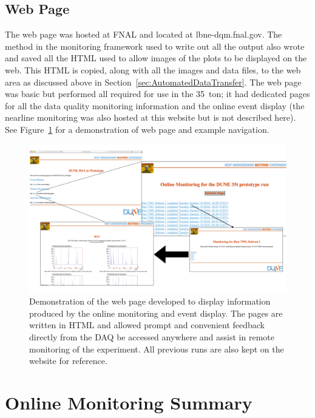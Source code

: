 \subsection{Web Page}\label{sec:WebPage}

The web page was hosted at FNAL and located at lbne-dqm.fnal.gov.  The method in the monitoring framework used to write out all the output also wrote and saved all the HTML used to allow images of the plots to be displayed on the web.  This HTML is copied, along with all the images and data files, to the web area as discussed above in Section~\ref{sec:AutomatedDataTransfer}.  The web page was basic but performed all required for use in the 35~ton; it had dedicated pages for all the data quality monitoring information and the online event display (the nearline monitoring was also hosted at this website but is not described here).  See Figure~\ref{fig:WebPage} for a demonstration of web page and example navigation.

\begin{figure}
  \centering
  \includegraphics[width=14cm]{webPage.png}
  \caption[Web page for online monitoring and event displays]{Demonstration of the web page developed to display information produced by the online monitoring and event display.  The pages are written in HTML and allowed prompt and convenient feedback directly from the DAQ be accessed anywhere and assist in remote monitoring of the experiment.  All previous runs are also kept on the website for reference.}
  \label{fig:WebPage}
\end{figure}

\section{Online Monitoring Summary}

